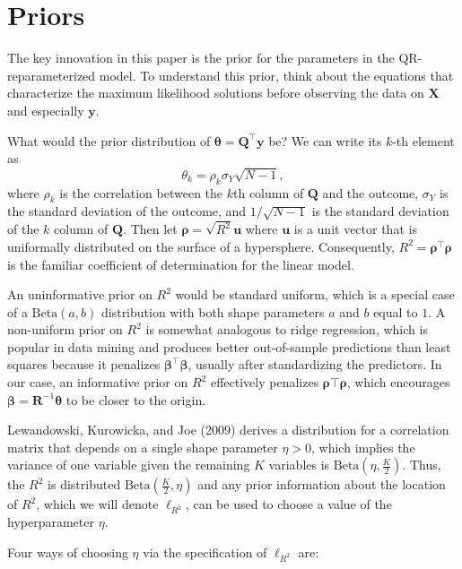 \documentclass[11pt]{article}
\begin{document}
\section{Priors}

The key innovation in this paper is the prior for the parameters in the
QR-reparameterized model. To understand this prior, think about the equations
that characterize the maximum likelihood solutions before observing the data on
$\mathbf{X}$ and especially $\mathbf{y}$.

What would the prior distribution of
$\boldsymbol{\theta} = \mathbf{Q}^\top \mathbf{y}$ be?
We can write its $k$-th element as
$$\theta_k = \rho_k \sigma_Y \sqrt{N - 1},$$
where $\rho_k$ is the correlation between the $k$th column of $\mathbf{Q}$ and
the outcome, $\sigma_Y$ is the standard deviation of the outcome, and
$1/\sqrt{N-1}$ is the standard deviation of the $k$ column of $\mathbf{Q}$.
Then let $\boldsymbol{\rho} = \sqrt{R^2}\mathbf{u}$ where $\mathbf{u}$ is a unit
vector that is uniformally distributed on the surface of a hypersphere.
Consequently, $R^2 = \boldsymbol{\rho}^\top \boldsymbol{\rho}$ is the familiar
coefficient of determination for the linear model.

An uninformative prior on $R^2$ would be standard uniform, which is a special
case of a $\mathrm{Beta}(a, b)$ distribution with both shape parameters $a$ and
$b$ equal to $1$. A non-uniform prior on $R^2$ is somewhat analogous to ridge
regression, which is popular in data mining and produces better out-of-sample
predictions than least squares because it penalizes
$\boldsymbol{\beta}^\top \boldsymbol{\beta}$,
usually after standardizing the predictors. In our case, an
informative prior on $R^2$ effectively penalizes
$\boldsymbol{\rho}\top \boldsymbol{\rho}$,
which encourages $\boldsymbol{\beta} = \mathbf{R}^{-1} \boldsymbol{\theta}$
to be closer to the origin.

Lewandowski, Kurowicka, and Joe (2009) derives a distribution for a correlation
matrix that depends on a single shape parameter $\eta > 0$, which implies the
variance of one variable given the remaining $K$ variables is
$\mathrm{Beta}\left(\eta,\frac{K}{2}\right)$. Thus, the $R^2$ is distributed
$\mathrm{Beta}\left(\frac{K}{2},\eta\right)$ and any prior information about the
location of $R^2$, which we will denote $\ell_{R^2}$, can be used to choose a
value of the hyperparameter $\eta$.

Four ways of choosing $\eta$ via the specification of $\ell_{R^2}$ are:
\end{document}
